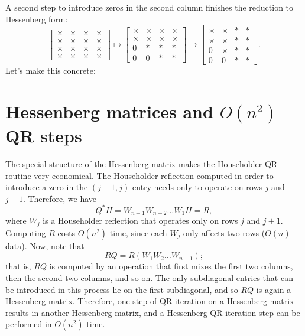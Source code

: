 \documentclass[12pt, leqno]{article} %
\begin{document}
A second step to introduce zeros in the second column finishes the
reduction to Hessenberg form:
\[
\begin{bmatrix}
  \times & \times & \times & \times \\
  \times & \times & \times & \times \\
  \times & \times & \times & \times \\
  \times & \times & \times & \times
\end{bmatrix} \mapsto
\begin{bmatrix}
  \times & \times & \times & \times \\
  \times & \times & \times & \times \\
  0 & * & * & * \\
  0 & 0 & * & *
\end{bmatrix} \mapsto
\begin{bmatrix}
  \times & \times & * & * \\
  \times & \times & * & * \\
  0 & \times & * & * \\
  0 & 0 & * & *
\end{bmatrix}.
\]
Let's make this concrete:


\section{Hessenberg matrices and $O(n^2)$ QR steps}

The special structure of the Hessenberg matrix makes the Householder
QR routine very economical.  The Householder reflection computed in
order to introduce a zero in the $(j+1,j)$ entry needs only to operate
on rows $j$ and $j+1$.  Therefore, we have
\[
  Q^* H = W_{n-1} W_{n-2} \ldots W_1 H = R,
\]
where $W_{j}$ is a Householder reflection that operates only on rows
$j$ and $j+1$.  Computing $R$ costs $O(n^2)$ time, since each $W_j$
only affects two rows ($O(n)$ data).  Now, note that
\[
  R Q = R (W_1 W_2 \ldots W_{n-1});
\]
that is, $RQ$ is computed by an operation that first mixes the first
two columns, then the second two columns, and so on.  The only subdiagonal
entries that can be introduced in this process lie on the first subdiagonal,
and so $RQ$ is again a Hessenberg matrix.  Therefore, one step of QR iteration
on a Hessenberg matrix results in another Hessenberg matrix, and a Hessenberg
QR iteration step can be performed in $O(n^2)$ time.
\end{document}
